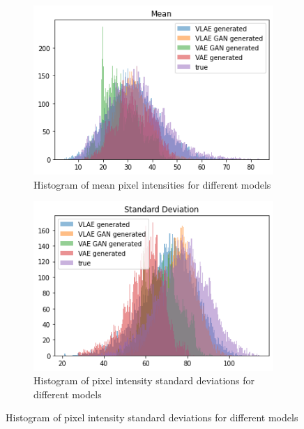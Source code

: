 \begin{figure}
    \centering
    \begin{subfigure}{0.48\textwidth}
        \centering
        \includegraphics[width=\textwidth]{images/generated_vs_true/mnist_vs_models_mean.png}
        \caption{Histogram of mean pixel intensities for different models}
        \label{subfig:mean_generated_vs_true}
    \end{subfigure}
    \hfill
    \begin{subfigure}{0.48\textwidth}
        \centering
        \includegraphics[width=\textwidth]{images/generated_vs_true/mnist_vs_models_sd.png}
        \caption{Histogram of pixel intensity standard deviations for different models}
        \label{subfig:sd_generated_vs_true}
    \end{subfigure}
    \hfill

\end{figure}
